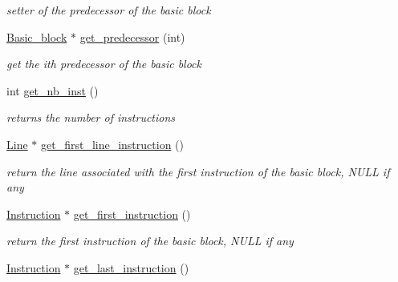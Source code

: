 \begin{DoxyCompactItemize}
\begin{DoxyCompactList}\small\item\em setter of the predecessor of the basic block \end{DoxyCompactList}\item 
\hypertarget{class_basic__block_a5381da0d3cfdae07df433ffac3e8ebae}{}\hyperlink{class_basic__block}{Basic\+\_\+block} $\ast$ \hyperlink{class_basic__block_a5381da0d3cfdae07df433ffac3e8ebae}{get\+\_\+predecessor} (int)\label{class_basic__block_a5381da0d3cfdae07df433ffac3e8ebae}

\begin{DoxyCompactList}\small\item\em get the ith predecessor of the basic block \end{DoxyCompactList}\item 
\hypertarget{class_basic__block_ad3d770c77ba92d455fa3430df5f16eff}{}int \hyperlink{class_basic__block_ad3d770c77ba92d455fa3430df5f16eff}{get\+\_\+nb\+\_\+inst} ()\label{class_basic__block_ad3d770c77ba92d455fa3430df5f16eff}

\begin{DoxyCompactList}\small\item\em returns the number of instructions \end{DoxyCompactList}\item 
\hypertarget{class_basic__block_a713786fa5bb012d4850dffb8f7771542}{}\hyperlink{class_line}{Line} $\ast$ \hyperlink{class_basic__block_a713786fa5bb012d4850dffb8f7771542}{get\+\_\+first\+\_\+line\+\_\+instruction} ()\label{class_basic__block_a713786fa5bb012d4850dffb8f7771542}

\begin{DoxyCompactList}\small\item\em return the line associated with the first instruction of the basic block, N\+U\+L\+L if any \end{DoxyCompactList}\item 
\hypertarget{class_basic__block_ae6bb481bd9c6352a9f3d7bc5bb2680ac}{}\hyperlink{class_instruction}{Instruction} $\ast$ \hyperlink{class_basic__block_ae6bb481bd9c6352a9f3d7bc5bb2680ac}{get\+\_\+first\+\_\+instruction} ()\label{class_basic__block_ae6bb481bd9c6352a9f3d7bc5bb2680ac}

\begin{DoxyCompactList}\small\item\em return the first instruction of the basic block, N\+U\+L\+L if any \end{DoxyCompactList}\item 
\hypertarget{class_basic__block_a7083c8485a2378cdfae477a8466eb348}{}\hyperlink{class_instruction}{Instruction} $\ast$ \hyperlink{class_basic__block_a7083c8485a2378cdfae477a8466eb348}{get\+\_\+last\+\_\+instruction} ()\label{class_basic__block_a7083c8485a2378cdfae477a8466eb348}


\end{DoxyCompactItemize}
